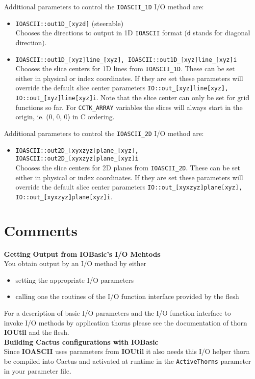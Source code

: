 \documentclass{article}
\begin{document}
%
Additional parameters to control the {\tt IOASCII\_1D} I/O method are:
\begin{itemize}
  \item {\tt IOASCII::out1D\_[xyzd]} (steerable)\\
        Chooses the directions to output in 1D {\tt IOASCII} format ({\tt d}
        stands for diagonal direction).
  \item {\tt IOASCII::out1D\_[xyz]line\_[xyz], IOASCII::out1D\_[xyz]line\_[xyz]i}\\
        Chooses the slice centers for 1D lines from {\tt IOASCII\_1D}. These
        can be set either in physical or index coordinates. If they are set
        these parameters will override the default slice center parameters
        {\tt IO::out\_[xyz]line[xyz], IO::out\_[xyz]line[xyz]i}.
        Note that the slice center can only be set for grid functions so far.
        For {\tt CCTK\_ARRAY} variables the slices will always start in the
        origin, ie. (0, 0, 0) in C ordering.
\end{itemize}
%
Additional parameters to control the {\tt IOASCII\_2D} I/O method are:
\begin{itemize}
  \item {\tt IOASCII::out2D\_[{xy}{xz}{yz}]plane\_[xyz], IOASCII::out2D\_[{xy}{xz}{yz}]plane\_[xyz]i}\\
        Chooses the slice centers for 2D planes from {\tt IOASCII\_2D}. These
        can be set either in physical or index coordinates. If they are set
        these parameters will override the default slice center parameters
        {\tt IO::out\_[{xy}{xz}{yz}]plane[xyz], IO::out\_[{xy}{xz}{yz}]plane[xyz]i}.
\end{itemize}
%
%
\section{Comments}
%
{\bf Getting Output from {\bf IOBasic}'s I/O Mehtods}\\
%
You obtain output by an I/O method by either
%
\begin{itemize}
  \item setting the appropriate I/O parameters
  \item calling one the routines of the I/O function interface provided by the flesh
\end{itemize}
%
For a description of basic I/O parameters and the I/O function interface to
invoke I/O methods by application thorns please see the documentation of thorn
{\bf IOUtil} and the flesh.\\[3ex]
%
{\bf Building Cactus configurations with {\bf IOBasic}}\\
%
Since {\bf IOASCII} uses parameters from {\bf IOUtil} it also needs this I/O
helper thorn be compiled into Cactus and activated at runtime in the
{\tt ActiveThorns} parameter in your parameter file.
%
%
\end{document}
